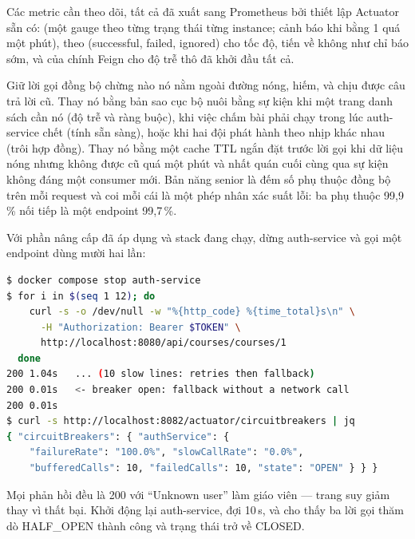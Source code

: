 Các metric cần theo dõi, tất cả đã xuất sang Prometheus bởi thiết lập
Actuator sẵn có:  (một gauge
theo từng trạng thái từng instance; cảnh báo khi 
bằng 1 quá một phút), 
theo  (successful, failed, ignored) cho tốc độ,
 tiến về
không như chỉ báo sớm, và  của
chính Feign cho độ trễ thô đã khởi đầu tất cả.

\begin{decision}
Giữ lời gọi đồng bộ chừng nào nó nằm ngoài đường nóng, hiếm, và chịu
được câu trả lời cũ. Thay nó bằng bản sao cục bộ nuôi bằng sự kiện khi
một trang danh sách cần nó (độ trễ và ràng buộc), khi việc chấm bài
phải chạy trong lúc auth-service chết (tính sẵn sàng), hoặc khi hai đội
phát hành theo nhịp khác nhau (trôi hợp đồng). Thay nó bằng một cache
TTL ngắn đặt trước lời gọi khi dữ liệu nóng nhưng không được cũ quá một
phút và nhất quán cuối cùng qua sự kiện không đáng một consumer mới.
Bản năng senior là đếm số phụ thuộc đồng bộ trên mỗi request và coi mỗi
cái là một phép nhân xác suất lỗi: ba phụ thuộc 99,9\,\% nối tiếp là
một endpoint 99,7\,\%.
\end{decision}

\begin{handson}
Với phần nâng cấp đã áp dụng và stack đang chạy, dừng auth-service và
gọi một endpoint dùng  mười hai lần:
\begin{lstlisting}[language=bash]
$ docker compose stop auth-service
$ for i in $(seq 1 12); do
    curl -s -o /dev/null -w "%{http_code} %{time_total}s\n" \
      -H "Authorization: Bearer $TOKEN" \
      http://localhost:8080/api/courses/courses/1
  done
200 1.04s   ... (10 slow lines: retries then fallback)
200 0.01s   <- breaker open: fallback without a network call
200 0.01s
$ curl -s http://localhost:8082/actuator/circuitbreakers | jq
{ "circuitBreakers": { "authService": {
    "failureRate": "100.0%", "slowCallRate": "0.0%",
    "bufferedCalls": 10, "failedCalls": 10, "state": "OPEN" } } }
\end{lstlisting}
Mọi phản hồi đều là 200 với ``Unknown user'' làm giáo viên --- trang
suy giảm thay vì thất bại. Khởi động lại auth-service, đợi 10\,s, và
\code{/actuator/circuitbreakerevents} cho thấy ba lời gọi thăm dò
HALF\_OPEN thành công và trạng thái trở về CLOSED.
\end{handson}

